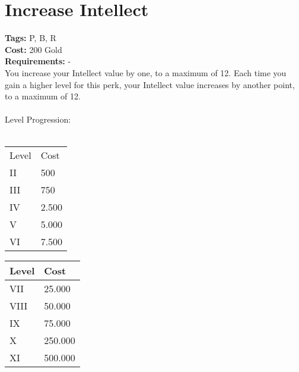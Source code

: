 \section{Increase Intellect}\label{sec:increaseintellect}
\textbf{Tags:} P, B, R\\
\textbf{Cost:} 200 Gold\\
\textbf{Requirements:} -\\
You increase your Intellect value by one, to a maximum of 12.
Each time you gain a higher level for this perk, your Intellect value increases by another point, to a maximum of 12.\\
\\
Level Progression:\\
\\
\begin{minipage}{0.5\textwidth}
    \begin{tabular}{l | l}
        Level & Cost\\
        II & 500\\
        III & 750\\
        IV & 2.500\\
        V & 5.000\\
        VI & 7.500\\
    \end{tabular}
\end{minipage}
\begin{minipage}{0.5\textwidth}
    \begin{tabular}{l | l}
        Level & Cost\\ \hline
        VII & 25.000\\
        VIII & 50.000\\
        IX & 75.000\\
        X & 250.000\\
        XI & 500.000\\
    \end{tabular}
\end{minipage}


